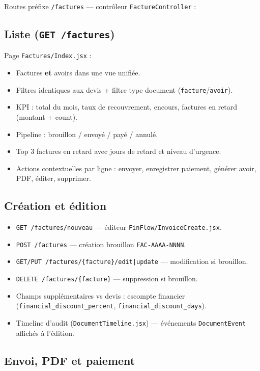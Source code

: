 \documentclass[11pt,a4paper]{report}
\newcommand{\route}[1]{\texttt{\small #1}}
\newcommand{\ctrl}[1]{\texttt{\small #1}}
\newcommand{\model}[1]{\texttt{\small #1}}
\begin{document}
Routes préfixe \route{/factures} — contrôleur \ctrl{FactureController} :

\subsection{Liste (\route{GET /factures})}

Page \texttt{Factures/Index.jsx} :
\begin{itemize}[leftmargin=*]
    \item Factures \textbf{et} avoirs dans une vue unifiée.
    \item Filtres identiques aux devis + filtre type document (\texttt{facture}/\texttt{avoir}).
    \item KPI : total du mois, taux de recouvrement, encours, factures en retard (montant + count).
    \item Pipeline : brouillon / envoyé / payé / annulé.
    \item Top 3 factures en retard avec jours de retard et niveau d'urgence.
    \item Actions contextuelles par ligne : envoyer, enregistrer paiement, générer avoir, PDF, éditer, supprimer.
\end{itemize}

\subsection{Création et édition}

\begin{itemize}[leftmargin=*]
    \item \route{GET /factures/nouveau} — éditeur \texttt{FinFlow/InvoiceCreate.jsx}.
    \item \route{POST /factures} — création brouillon \texttt{FAC-AAAA-NNNN}.
    \item \route{GET/PUT /factures/\{facture\}/edit|update} — modification si brouillon.
    \item \route{DELETE /factures/\{facture\}} — suppression si brouillon.
    \item Champs supplémentaires vs devis : escompte financier (\texttt{financial\_discount\_percent}, \texttt{financial\_discount\_days}).
    \item Timeline d'audit (\texttt{DocumentTimeline.jsx}) — événements \model{DocumentEvent} affichés à l'édition.
\end{itemize}

\subsection{Envoi, PDF et paiement}
\end{document}
